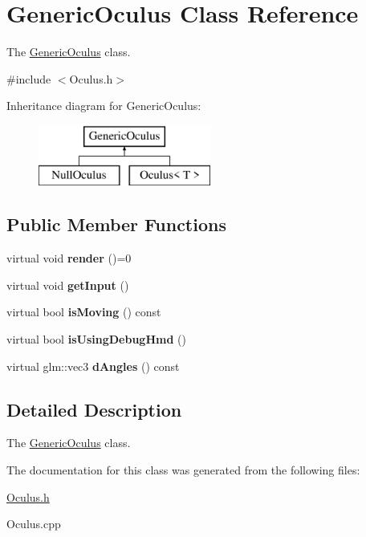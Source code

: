 \hypertarget{classGenericOculus}{}\section{Generic\+Oculus Class Reference}
\label{classGenericOculus}


The \hyperlink{classGenericOculus}{Generic\+Oculus} class.  




{\ttfamily \#include $<$Oculus.\+h$>$}

Inheritance diagram for Generic\+Oculus\+:\begin{figure}[H]
\begin{center}
\leavevmode
\includegraphics[height=2.000000cm]{classGenericOculus}
\end{center}
\end{figure}
\subsection*{Public Member Functions}
\begin{DoxyCompactItemize}
\item 
\hypertarget{classGenericOculus_a86a6f7f822d15f45ac6df6842b1dc4ce}{}virtual void {\bfseries render} ()=0\label{classGenericOculus_a86a6f7f822d15f45ac6df6842b1dc4ce}

\item 
\hypertarget{classGenericOculus_a80b6766dd4a710d6b75a2dc2e746b753}{}virtual void {\bfseries get\+Input} ()\label{classGenericOculus_a80b6766dd4a710d6b75a2dc2e746b753}

\item 
\hypertarget{classGenericOculus_a074b05f3be2cb859b00c49e779685276}{}virtual bool {\bfseries is\+Moving} () const \label{classGenericOculus_a074b05f3be2cb859b00c49e779685276}

\item 
\hypertarget{classGenericOculus_a5d62cc682f918c2cfad7d139b1ff3299}{}virtual bool {\bfseries is\+Using\+Debug\+Hmd} ()\label{classGenericOculus_a5d62cc682f918c2cfad7d139b1ff3299}

\item 
\hypertarget{classGenericOculus_ad679f6563497fa5b79f32d2295a32e6e}{}virtual glm\+::vec3 {\bfseries d\+Angles} () const \label{classGenericOculus_ad679f6563497fa5b79f32d2295a32e6e}

\end{DoxyCompactItemize}


\subsection{Detailed Description}
The \hyperlink{classGenericOculus}{Generic\+Oculus} class. 

The documentation for this class was generated from the following files\+:\begin{DoxyCompactItemize}
\item 
\hyperlink{Oculus_8h}{Oculus.\+h}\item 
Oculus.\+cpp\end{DoxyCompactItemize}
